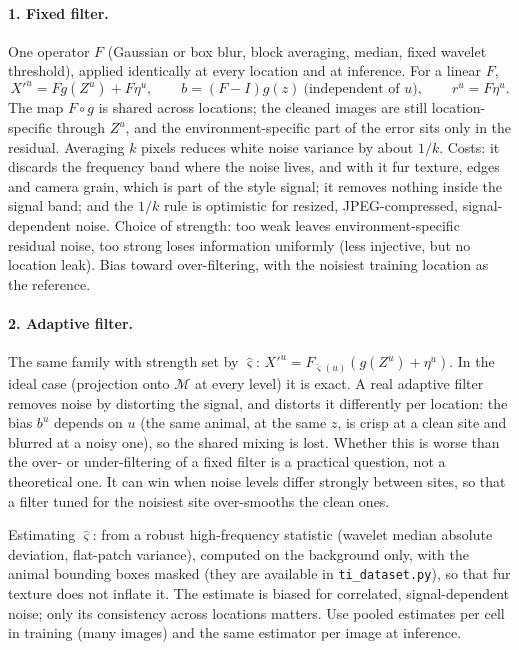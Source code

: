 \paragraph{1. Fixed filter.} One operator $F$ (Gaussian or box blur, block averaging, median, fixed
wavelet threshold), applied identically at every location and at inference. For a linear $F$,
\[
X'^u=Fg(Z^u)+F\eta^u,\qquad b=(F-I)g(z)\ \text{(independent of }u),\qquad r^u=F\eta^u .
\]
The map $F\circ g$ is shared across locations; the cleaned images are still location-specific through
$Z^u$, and the environment-specific part of the error sits only in the residual. Averaging $k$ pixels
reduces white noise variance by about $1/k$. Costs: it discards the
frequency band where the noise lives, and with it fur texture, edges and camera grain, which is part of
the style signal; it removes nothing inside the signal band; and the $1/k$ rule is optimistic for
resized, JPEG-compressed, signal-dependent noise. Choice of strength: too weak leaves
environment-specific residual noise, too strong loses information uniformly (less injective, but no
location leak). Bias toward over-filtering, with the noisiest training location as the reference.

\paragraph{2. Adaptive filter.} The same family with strength set by $\hat\varsigma$:
$X'^u=F_{\hat\varsigma(u)}(g(Z^u)+\eta^u)$. In the ideal case (projection onto $\mathcal M$ at every
level) it is exact. A real adaptive filter removes noise by distorting the signal, and distorts it
differently per location: the bias $b^u$ depends on $u$ (the same animal, at the same $z$, is crisp at a
clean site and blurred at a noisy one), so the shared mixing is lost. Whether this is worse than the
over- or under-filtering of a fixed filter is a practical question, not a theoretical one. It can win
when noise levels differ strongly between sites, so that a filter tuned for the noisiest site
over-smooths the clean ones.

Estimating $\hat\varsigma$: from a robust high-frequency statistic (wavelet median absolute deviation,
flat-patch variance), computed on the background only, with the animal bounding boxes masked (they are
available in \texttt{ti\_dataset.py}), so that fur texture does not inflate it. The estimate is biased
for correlated, signal-dependent noise; only its consistency across locations matters. Use pooled
estimates per cell in training (many images) and the same estimator per image at inference.

